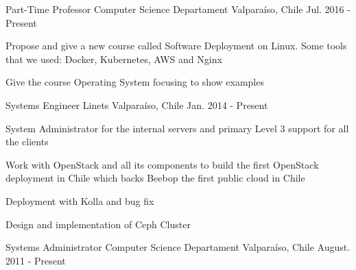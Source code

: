 \begin{cventries}
  \cventry
    {Part-Time Professor}
    {Computer Science Departament}
    {Valparaíso, Chile}
    {Jul. 2016 - Present}
    {
      \begin{cvitems}
        \item {Propose and give a new course called Software Deployment on Linux. Some tools that we used: Docker, Kubernetes, AWS and Nginx}
        \item {Give the course Operating System focusing to show examples}
      \end{cvitems}
    }

  \cventry
    {Systems Engineer}
    {Linets}
    {Valparaíso, Chile}
    {Jan. 2014 - Present}
    {
      \begin{cvitems}
        \item {System Administrator for the internal servers and primary Level 3 support for all the clients}
        \item {Work with OpenStack and all its components to build the first OpenStack deployment in Chile which backs Beebop the first public cloud in Chile}
        \item {Deployment with Kolla and bug fix}
        \item {Design and implementation of Ceph Cluster}
      \end{cvitems}
    }
    
  \cventry
    {Systems Administrator}
    {Computer Science Departament}
    {Valparaíso, Chile}
    {August. 2011 - Present}
    {
      \begin{cvitems}
		\item{}
      \end{cvitems}
    }    
\end{cventries}
